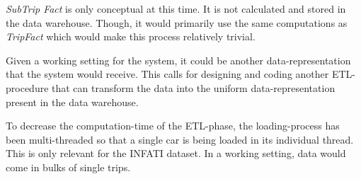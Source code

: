 \textit{SubTrip Fact} is only conceptual at this time. It is not calculated and stored in the data warehouse. Though, it would primarily use the same computations as \textit{TripFact} which would make this process relatively trivial.

Given a working setting for the system, it could be another data-representation that the system would receive. This calls for designing and coding another ETL-procedure that can transform the data into the uniform data-representation present in the data warehouse.

To decrease the computation-time of the ETL-phase, the loading-process has been multi-threaded so that a single car is being loaded in its individual thread. This is only relevant for the INFATI dataset. In a working setting, data would come in bulks of single trips. 